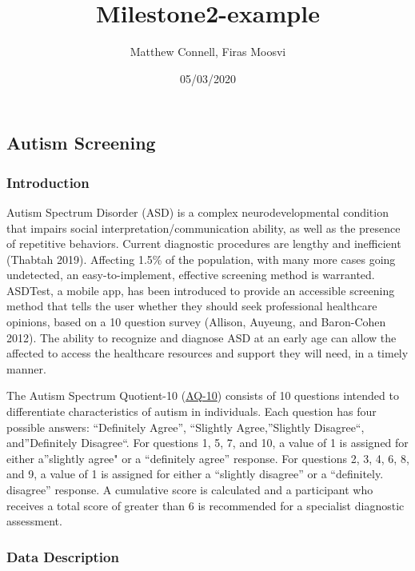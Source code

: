 \documentclass[]{article}
\title{Milestone2-example}
\author{Matthew Connell, Firas Moosvi}
\date{05/03/2020}
\begin{document}
\maketitle

\hypertarget{autism-screening}{%
\subsection{Autism Screening}\label{autism-screening}}

\hypertarget{introduction}{%
\subsubsection{Introduction}\label{introduction}}

Autism Spectrum Disorder (ASD) is a complex neurodevelopmental condition
that impairs social interpretation/communication ability, as well as the
presence of repetitive behaviors. Current diagnostic procedures are
lengthy and inefficient (Thabtah 2019). Affecting 1.5\% of the
population, with many more cases going undetected, an easy-to-implement,
effective screening method is warranted. ASDTest, a mobile app, has been
introduced to provide an accessible screening method that tells the user
whether they should seek professional healthcare opinions, based on a 10
question survey (Allison, Auyeung, and Baron-Cohen 2012). The ability to
recognize and diagnose ASD at an early age can allow the affected to
access the healthcare resources and support they will need, in a timely
manner.

The Autism Spectrum Quotient-10
(\href{https://www.nice.org.uk/guidance/cg142/resources/autism-spectrum-quotient-aq10-test-pdf-186582493}{AQ-10})
consists of 10 questions intended to differentiate characteristics of
autism in individuals. Each question has four possible answers:
``Definitely Agree'', ``Slightly Agree,''Slightly Disagree``,
and''Definitely Disagree``. For questions 1, 5, 7, and 10, a value of 1
is assigned for either a''slightly agree" or a ``definitely agree''
response. For questions 2, 3, 4, 6, 8, and 9, a value of 1 is assigned
for either a ``slightly disagree'' or a ``definitely. disagree''
response. A cumulative score is calculated and a participant who
receives a total score of greater than 6 is recommended for a specialist
diagnostic assessment.

\hypertarget{data-description}{%
\subsubsection{Data Description}\label{data-description}}
\end{document}
